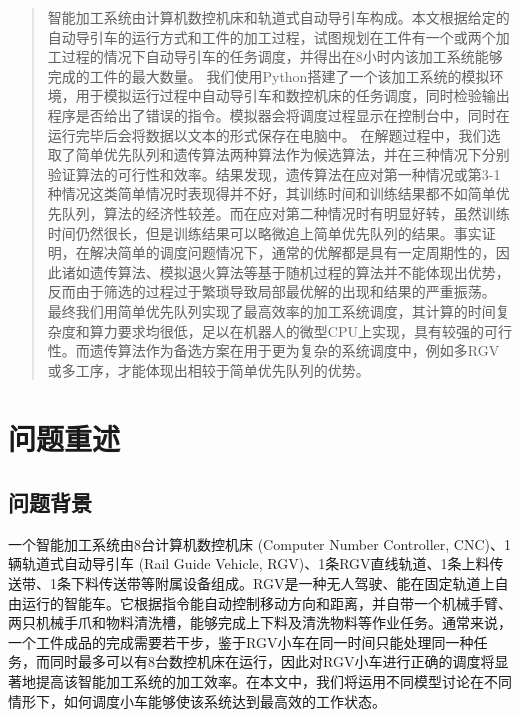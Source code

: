 \documentclass{cumcmthesis}
\begin{document}
	
	\begin{abstract}
	智能加工系统由计算机数控机床和轨道式自动导引车构成。本文根据给定的自动导引车的运行方式和工件的加工过程，试图规划在工件有一个或两个加工过程的情况下自动导引车的任务调度，并得出在8小时内该加工系统能够完成的工件的最大数量。\newline
	\indent 我们使用Python搭建了一个该加工系统的模拟环境，用于模拟运行过程中自动导引车和数控机床的任务调度，同时检验输出程序是否给出了错误的指令。模拟器会将调度过程显示在控制台中，同时在运行完毕后会将数据以文本的形式保存在电脑中。\newline
	\indent 在解题过程中，我们选取了简单优先队列和遗传算法两种算法作为候选算法，并在三种情况下分别验证算法的可行性和效率。结果发现，遗传算法在应对第一种情况或第3-1种情况这类简单情况时表现得并不好，其训练时间和训练结果都不如简单优先队列，算法的经济性较差。而在应对第二种情况时有明显好转，虽然训练时间仍然很长，但是训练结果可以略微追上简单优先队列的结果。事实证明，在解决简单的调度问题情况下，通常的优解都是具有一定周期性的，因此诸如遗传算法、模拟退火算法等基于随机过程的算法并不能体现出优势，反而由于筛选的过程过于繁琐导致局部最优解的出现和结果的严重振荡。\newline
	\indent 最终我们用简单优先队列实现了最高效率的加工系统调度，其计算的时间复杂度和算力要求均很低，足以在机器人的微型CPU上实现，具有较强的可行性。而遗传算法作为备选方案在用于更为复杂的系统调度中，例如多RGV或多工序，才能体现出相较于简单优先队列的优势。

	\end{abstract}
	
	\tableofcontents
	
	\section{问题重述}
	\subsection{问题背景}
	一个智能加工系统由8台计算机数控机床 (Computer Number Controller, CNC)、1辆轨道式自动导引车 (Rail Guide Vehicle, RGV)、1条RGV直线轨道、1条上料传送带、1条下料传送带等附属设备组成。RGV是一种无人驾驶、能在固定轨道上自由运行的智能车。它根据指令能自动控制移动方向和距离，并自带一个机械手臂、两只机械手爪和物料清洗槽，能够完成上下料及清洗物料等作业任务。\cite{Saiti}通常来说，一个工件成品的完成需要若干步，鉴于RGV小车在同一时间只能处理同一种任务，而同时最多可以有8台数控机床在运行，因此对RGV小车进行正确的调度将显著地提高该智能加工系统的加工效率。在本文中，我们将运用不同模型讨论在不同情形下，如何调度小车能够使该系统达到最高效的工作状态。
	
\end{document}
